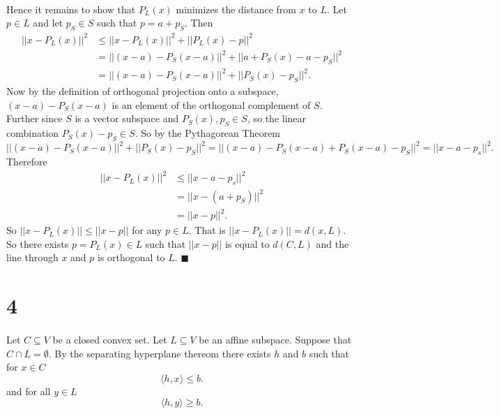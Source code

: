 \documentclass[letterpaper,12pt,oneside,onecolumn]{article}
\begin{document}
\paragraph{}
Hence it remains to show that $P_L(x)$ minimizes the distance from $x$ to $L$. Let $p \in L$ and let $p_S \in S$ such that $p = a + p_S$. Then
\begin{align*}
||x- P_L(x) ||^2 &\leq ||x - P_L(x) ||^2 + ||P_L(x) - p||^2 \\
&= ||(x-a) - P_S(x-a) ||^2 + ||a + P_S(x) - a - p_S ||^2 \\
&= ||(x-a) - P_S(x-a) ||^2 + ||P_S(x) - p_S||^2.
\end{align*}
Now by the definition of orthogonal projection onto a subspace, $(x-a) - P_S(x-a)$ is an element of the orthogonal complement of $S$. Further since $S$ is a vector subspace and $P_S(x), p_S \in S$, so the linear combination $P_S(x) - p_S \in S$. So by the Pythagorean Theorem
$$ ||(x-a) - P_S(x-a) ||^2 + ||P_S(x) - p_S||^2 = ||(x-a) - P_S(x-a) + P_S(x-a) - p_S||^2 = ||x-a - p_s||^2.$$
Therefore 
\begin{align*}
||x- P_L(x) ||^2 &\leq ||x-a - p_s||^2 \\
&= ||x - (a+ p_S) ||^2 \\
&= ||x - p||^2.
\end{align*}
So $||x- P_L(x) || \leq ||x-p||$ for any $p \in L$. That is $||x - P_L(x)|| = d(x,L)$. So there exists $p = P_L(x) \in L$ such that $||x-p||$ is equal to $d(C, L)$ and the line through $x$ and $p$ is orthogonal to $L$. $\blacksquare$
\section*{4}
\paragraph{}
Let $C \subseteq V$ be a closed convex set. Let $L \subseteq V$ be an affine subspace. Suppose that $C \cap L = \emptyset$. By the separating hyperplane thereom there exists $h$ and $b$ such that for $x \in C$
$$\langle h, x \rangle \leq b.$$
and for all $y \in L$
$$\langle h, y \rangle \geq b.$$
\end{document}
